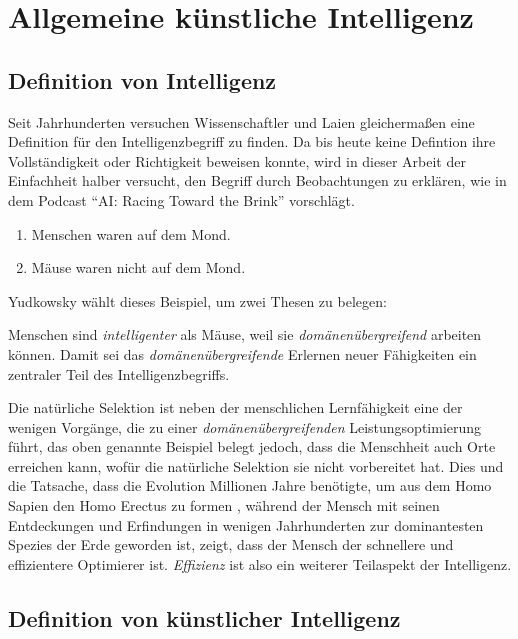 \chapter{Allgemeine künstliche Intelligenz}
\section{Definition von Intelligenz} \label{Intelligenzbegriff}
Seit Jahrhunderten versuchen Wissenschaftler und Laien gleichermaßen eine Definition für den Intelligenzbegriff zu finden. Da bis heute keine Defintion ihre Vollständigkeit oder Richtigkeit beweisen konnte, wird in dieser Arbeit der Einfachheit halber versucht, den Begriff durch Beobachtungen zu erklären, wie \citeauthor{EliezerPodcast} in dem Podcast \enquote{AI: Racing Toward the Brink} vorschlägt. 
\begin{enumerate}
\item Menschen waren auf dem Mond.
\item Mäuse waren nicht auf dem Mond.
\end{enumerate}
Yudkowsky wählt dieses Beispiel, um zwei Thesen zu belegen:

Menschen sind \emph{intelligenter} als Mäuse, weil sie \emph{domänenübergreifend} arbeiten können. Damit sei das \emph{domänenübergreifende} Erlernen neuer Fähigkeiten ein zentraler Teil des Intelligenzbegriffs.


Die natürliche Selektion ist neben der menschlichen Lernfähigkeit eine der wenigen Vorgänge, die zu einer \emph{domänenübergreifenden} Leistungsoptimierung führt, das oben genannte Beispiel belegt jedoch, dass die Menschheit auch Orte erreichen kann, wofür die natürliche Selektion sie nicht vorbereitet hat. Dies und die Tatsache, dass die Evolution Millionen Jahre benötigte, um aus dem Homo Sapien den Homo Erectus zu formen , während der Mensch mit seinen Entdeckungen und Erfindungen in wenigen Jahrhunderten zur dominantesten Spezies der Erde geworden ist, zeigt, dass der Mensch der schnellere und effizientere Optimierer ist. \emph{Effizienz} ist also ein weiterer Teilaspekt der Intelligenz.

\section{Definition von künstlicher Intelligenz}

